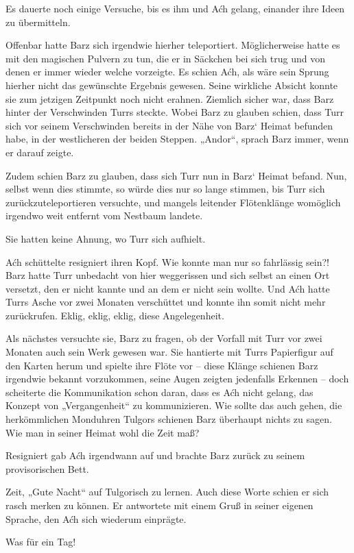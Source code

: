 Es dauerte noch einige Versuche, bis es ihm und Aćh gelang, einander ihre Ideen zu übermitteln.

Offenbar hatte Barz sich irgendwie hierher teleportiert. Möglicherweise hatte es mit den magischen Pulvern zu tun, die er in Säckchen bei sich trug und von denen er immer wieder welche vorzeigte. Es schien Aćh, als wäre sein Sprung hierher nicht das gewünschte Ergebnis gewesen. Seine wirkliche Absicht konnte sie zum jetzigen Zeitpunkt noch nicht erahnen. Ziemlich sicher war, dass Barz hinter der Verschwinden Turrs steckte. Wobei Barz zu glauben schien, dass Turr sich vor seinem Verschwinden bereits in der Nähe von Barz‘ Heimat befunden habe, in der westlicheren der beiden Steppen. „Andor“, sprach Barz immer, wenn er darauf zeigte.

Zudem schien Barz zu glauben, dass sich Turr nun in Barz‘ Heimat befand. Nun, selbst wenn dies stimmte, so würde dies nur so lange stimmen, bis Turr sich zurückzuteleportieren versuchte, und mangels leitender Flötenklänge womöglich irgendwo weit entfernt vom Nestbaum landete.

Sie hatten keine Ahnung, wo Turr sich aufhielt.

Aćh schüttelte resigniert ihren Kopf. Wie konnte man nur so fahrlässig sein?! Barz hatte Turr unbedacht von hier weggerissen und sich selbst an einen Ort versetzt, den er nicht kannte und an dem er nicht sein wollte. Und Aćh hatte Turrs Asche vor zwei Monaten verschüttet und konnte ihn somit nicht mehr zurückrufen. Eklig, eklig, eklig, diese Angelegenheit.

Als nächstes versuchte sie, Barz zu fragen, ob der Vorfall mit Turr vor zwei Monaten auch sein Werk gewesen war. Sie hantierte mit Turrs Papierfigur auf den Karten herum und spielte ihre Flöte vor – diese Klänge schienen Barz irgendwie bekannt vorzukommen, seine Augen zeigten jedenfalls Erkennen – doch scheiterte die Kommunikation schon daran, dass es Aćh nicht gelang, das Konzept von „Vergangenheit“ zu kommunizieren. Wie sollte das auch gehen, die herkömmlichen Monduhren Tulgors schienen Barz überhaupt nichts zu sagen. Wie man in seiner Heimat wohl die Zeit maß?

Resigniert gab Aćh irgendwann auf und brachte Barz zurück zu seinem provisorischen Bett.

Zeit, „Gute Nacht“ auf Tulgorisch zu lernen. Auch diese Worte schien er sich rasch merken zu können. Er antwortete mit einem Gruß in seiner eigenen Sprache, den Aćh sich wiederum einprägte.

Was für ein Tag!\bigskip







